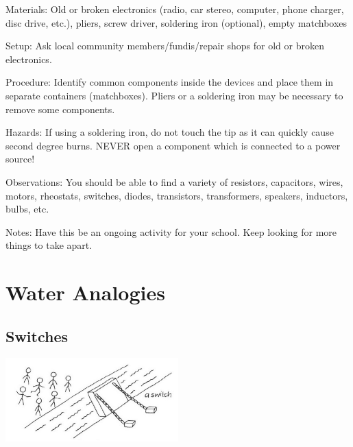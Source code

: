 \begin{multicols}{2}
\begin{description*}
\item[Materials:]{Old or broken electronics (radio, car stereo, computer, phone charger, disc drive, etc.), pliers, screw driver, soldering iron (optional), empty matchboxes}
\item[Setup:]{Ask local community members/fundis/repair shops for old or broken electronics. }
\item[Procedure:]{Identify common components inside the devices and place them in separate containers (matchboxes). Pliers or a soldering iron may be necessary to remove some components.}
\item[Hazards:]{If using a soldering iron, do not touch the tip as it can quickly cause second degree burns. NEVER open a component which is connected to a power source!}
\item[Observations:]{You should be able to find a variety of resistors, capacitors, wires, motors, rheostats, switches, diodes, transistors, transformers, speakers, inductors, bulbs, etc.}
\item[Notes:]{Have this be an ongoing activity for your school. Keep looking for more things to take apart.}
\end{description*}

\columnbreak


\section*{Water Analogies}


\subsection*{Switches}

\begin{center}
\includegraphics[width=0.5\textwidth]{./img/vso/analogy-switch.jpg}
\end{center}


\end{multicols}
